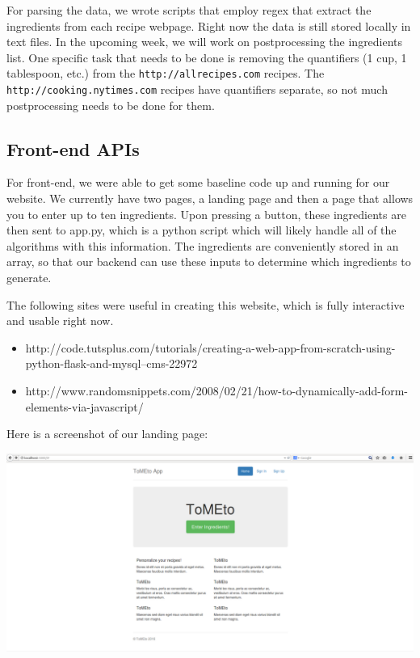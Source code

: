 \documentclass{article}
\begin{document}
For parsing the data, we wrote scripts that employ regex that extract the ingredients from each recipe webpage. Right now the data is still stored locally in text files. In the upcoming week, we will work on postprocessing the ingredients list. One specific task that needs to be done is removing the quantifiers (1 cup, 1 tablespoon, etc.) from the \texttt{http://allrecipes.com} recipes. The \texttt{http://cooking.nytimes.com} recipes have quantifiers separate, so not much postprocessing needs to be done for them.


\subsection{Front-end APIs}
For front-end, we were able to get some baseline code up and running for our website. We currently have two pages, a landing page and then a page that allows you to enter up to ten ingredients. Upon pressing a button, these ingredients are then sent to app.py, which is a python script which will likely handle all of the algorithms with this information. The ingredients are conveniently stored in an array, so that our backend can use these inputs to determine which ingredients to generate. 

The following sites were useful in creating this website, which is fully interactive and usable right now.
\begin{itemize}
\item http://code.tutsplus.com/tutorials/creating-a-web-app-from-scratch-using-python-flask-and-mysql--cms-22972 
\item http://www.randomsnippets.com/2008/02/21/how-to-dynamically-add-form-elements-via-javascript/ 
\end{itemize}

Here is a screenshot of our landing page: \\
\begin{center}
\includegraphics[scale=0.3]{firstpage.PNG}
\end{center}
\end{document}
